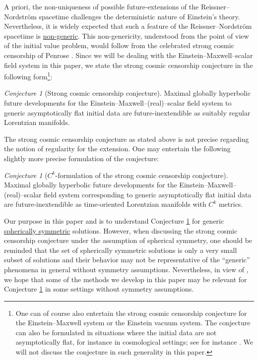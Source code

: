 \documentclass[10pt, reqno]{amsart}
\theoremstyle{definition}
\theoremstyle{remark}
\newtheorem{conjecture}[theorem]{Conjecture}
\numberwithin{equation}{section}
\newcommand{\0}{\emptyset}
\begin{document}
A priori, the non-uniqueness of possible future-extensions of the Reissner--Nordstr\"om spacetime challenges the deterministic nature of Einstein's theory. Nevertheless, it is widely expected that such a feature of the Reissner--Nordstr\"om spacetime is \underline{non-generic}. This non-genericity, understood from the point of view of the initial value problem, would follow from the celebrated strong cosmic censorship of Penrose \cite{Penrose.SCC}. Since we will be dealing with the Einstein--Maxwell--scalar field system in this paper, we state the strong cosmic censorship conjecture in the following form\footnote{One can of course also entertain the strong cosmic censorship conjecture for the Einstein--Maxwell system or the Einstein vacuum system. The conjecture can also be formulated in situations where the initial data are not asymptotically flat, for instance in cosmological settings; see for instance \cite{Ringstrom.book}. We will not discuss the conjecture in such generality in this paper.}:
\begin{conjecture}[Strong cosmic censorship conjecture]
Maximal globally hyperbolic future developments for the Einstein--Maxwell--(real)--scalar field system to generic asymptotically flat initial data are future-inextendible as suitably regular Lorentzian manifolds.
\end{conjecture}
The strong cosmic censorship conjecture as stated above is not precise regarding the notion of regularity for the extension. One may entertain the following slightly more precise formulation of the conjecture:
\begin{conjecture}[$C^k$-formulation of the strong cosmic censorship conjecture]\label{conj.Ck}
Maximal globally hyperbolic future developments for the Einstein--Maxwell--(real)--scalar field system corresponding to generic asymptotically flat initial data are future-inextendible as time-oriented Lorentzian manifolds with $C^k$ metrics.
\end{conjecture}
Our purpose in this paper and \cite{LO.exterior} is to understand Conjecture \ref{conj.Ck} for generic \underline{spherically symmetric} solutions. However, when discussing the strong cosmic censorship conjecture under the assumption of spherical symmetry, one should be reminded that the set of spherically symmetric solutions is only a very small subset of solutions and their behavior may not be representative of the ``generic'' phenomena in general without symmetry assumptions. Nevertheless, in view of \cite{DL}, we hope that some of the methods we develop in this paper may be relevant for Conjecture \ref{conj.Ck} in some settings without symmetry assumptions.
\end{document}
